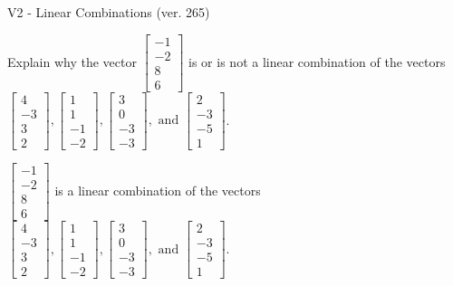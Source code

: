 \begin{exercise}
  \begin{exerciseTitle}V2 - Linear Combinations (ver. 265)\end{exerciseTitle}
  \begin{exerciseStatement}
    Explain why the vector \(\left[\begin{array}{c}
-1 \\
-2 \\
8 \\
6
\end{array}\right]\)  is or is not a linear 
	combination of the vectors \(\left[\begin{array}{c}
4 \\
-3 \\
3 \\
2
\end{array}\right] , \left[\begin{array}{c}
1 \\
1 \\
-1 \\
-2
\end{array}\right] , \left[\begin{array}{c}
3 \\
0 \\
-3 \\
-3
\end{array}\right] , \text{ and } \left[\begin{array}{c}
2 \\
-3 \\
-5 \\
1
\end{array}\right]\).
	


  \end{exerciseStatement}
  \begin{exerciseAnswer}
   \(\left[\begin{array}{c}
-1 \\
-2 \\
8 \\
6
\end{array}\right]\) 
  	 is  
	a linear combination of the vectors \(\left[\begin{array}{c}
4 \\
-3 \\
3 \\
2
\end{array}\right] , \left[\begin{array}{c}
1 \\
1 \\
-1 \\
-2
\end{array}\right] , \left[\begin{array}{c}
3 \\
0 \\
-3 \\
-3
\end{array}\right] , \text{ and } \left[\begin{array}{c}
2 \\
-3 \\
-5 \\
1
\end{array}\right]\).


\end{exerciseAnswer}
\end{exercise}
